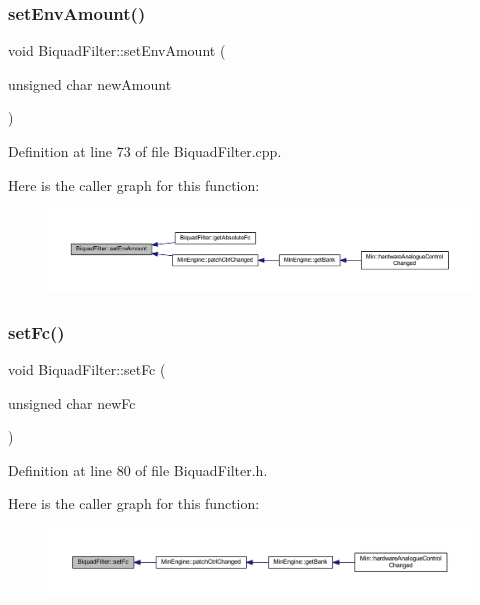 \subsubsection{\texorpdfstring{set\+Env\+Amount()}{setEnvAmount()}}
{\footnotesize\ttfamily void Biquad\+Filter\+::set\+Env\+Amount (\begin{DoxyParamCaption}\item[{unsigned char}]{new\+Amount }\end{DoxyParamCaption})}



Definition at line 73 of file Biquad\+Filter.\+cpp.

Here is the caller graph for this function\+:
\nopagebreak
\begin{figure}[H]
\begin{center}
\leavevmode
\includegraphics[width=350pt]{d9/d6f/class_biquad_filter_a5bc855d79f31804b2fa8c4b7ef2fba3d_icgraph}
\end{center}
\end{figure}
\mbox{\label{class_biquad_filter_a8622e15237db2ecd042a2efff133ece3}} 
\subsubsection{\texorpdfstring{set\+Fc()}{setFc()}}
{\footnotesize\ttfamily void Biquad\+Filter\+::set\+Fc (\begin{DoxyParamCaption}\item[{unsigned char}]{new\+Fc }\end{DoxyParamCaption})\hspace{0.3cm}{\ttfamily [inline]}}



Definition at line 80 of file Biquad\+Filter.\+h.

Here is the caller graph for this function\+:
\nopagebreak
\begin{figure}[H]
\begin{center}
\leavevmode
\includegraphics[width=350pt]{d9/d6f/class_biquad_filter_a8622e15237db2ecd042a2efff133ece3_icgraph}
\end{center}
\end{figure}
\mbox{\label{class_biquad_filter_aa729bb052d8d58e3ee6b5121c2d05810}} 
